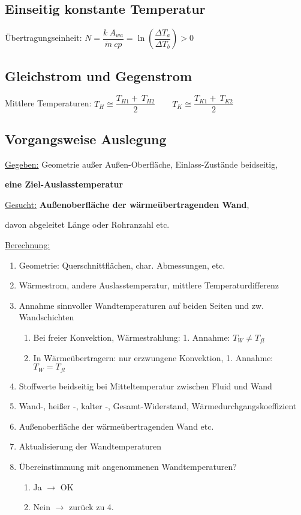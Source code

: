 \subsection{Einseitig konstante Temperatur} \label{sec:einseitig-konst-T}
	Übertragungseinheit: \qquad $ N  =  \dfrac{k\ A_{wa}}{\dot{m}\ cp}  =   \ln\left( \dfrac{\Delta T_a}{\Delta T_b} \right)  >  0 $

\subsection{Gleichstrom und Gegenstrom}
	Mittlere Temperaturen:	\qquad	$ T_H \cong \dfrac{T_{H1}+\ T_{H2}}{2}  \qquad T_K\cong \dfrac{T_{K1}+\ T_{K2}}{2} $

\subsection{Vorgangsweise Auslegung}
	\underline{Gegeben:} Geometrie außer Außen-Oberfläche, Einlass-Zustände beidseitig,

		\qquad \textbf{eine Ziel-Auslasstemperatur }

	\underline{Gesucht:} \textbf{Außenoberfläche der wärmeübertragenden Wand},

		\qquad davon abgeleitet Länge oder Rohranzahl etc.

	\begin{singlespace}
	\underline{Berechnung:}
		\begin{enumerate}
		\item Geometrie: Querschnittflächen, char. Abmessungen, etc.
		\item Wärmestrom, andere Auslasstemperatur, mittlere Temperaturdifferenz
		\item Annahme sinnvoller Wandtemperaturen auf beiden Seiten und zw. Wandschichten
		\begin{enumerate}
			\item Bei freier Konvektion, Wärmestrahlung:          \hfill 1. Annahme:	$ T_W \neq T_{fl}  $ \qquad\qquad\qquad\null
			\item In Wärmeübertragern: nur erzwungene Konvektion, \hfill 1. Annahme:	$ T_W = T_{fl} $     \qquad\qquad\qquad\null
		\end{enumerate}
		\item Stoffwerte beidseitig bei Mitteltemperatur zwischen Fluid und Wand
		\item Wand-, heißer -, kalter -, Gesamt-Widerstand, Wärmedurchgangskoeffizient
		\item Außenoberfläche der wärmeübertragenden Wand etc.
		\item Aktualisierung der Wandtemperaturen
		\item Übereinstimmung mit angenommenen Wandtemperaturen?
		\begin{enumerate}
			\item Ja $ \rightarrow $ OK
			\item Nein $ \rightarrow $ zurück zu 4.
		\end{enumerate}
		\end{enumerate}
	\end{singlespace}

